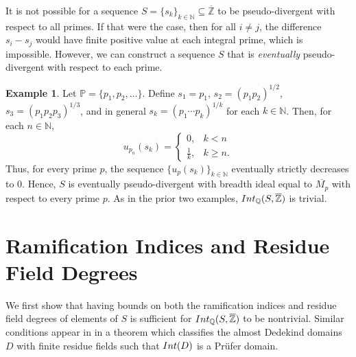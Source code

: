 \documentclass{article}
\theoremstyle{definition}\newtheorem{Def}[equation]{Definition}
\newtheorem{Ex}[equation]{Example}
\theoremstyle{definition}\newtheorem{Ques}[equation]{Question}
\theoremstyle{definition}\newtheorem{Conj}[equation]{Conjecture}
\theoremstyle{definition}\newtheorem{Not}[equation]{Notation}
\newcommand{\N}{\mathbb{N}}
\newcommand{\Q}{\mathbb{Q}}
\newcommand{\oQ}{\overline{\Q}}
\newcommand{\oZ}{\overline{\Z}}
\newcommand{\Z}{\mathbb{Z}}
\newcommand{\oMp}{\overline{M_p}}
\newcommand{\Int}{\textnormal{Int}}
\newcommand{\IntQ}{\Int_{\Q}}
\newcommand{\PP}{\mathbb{P}}
\numberwithin{equation}{section}
\begin{document}
It is not possible for a sequence $S = \{s_k\}_{k \in \N} \subseteq \oZ$ to be pseudo-divergent with respect to all primes. If that were the case, then for all $i \ne j$, the difference $s_i-s_j$ would have finite positive value at each integral prime, which is impossible. However, we can construct a sequence $S$ that is \textit{eventually} pseudo-divergent with respect to each prime.


\begin{Ex}\label{Pseudo-divergent example}
Let $\PP=\{p_1, p_2, \ldots\}$. Define $s_1 = p_1$, $s_2 = (p_1p_2)^{1/2}$, $s_3 = (p_1p_2p_3)^{1/3}$, and in general $s_k = (p_1 \cdots p_k)^{1/k}$ for each $k \in \N$. 
Then, for each $n \in \N$,
\begin{equation*}
u_{p_n}(s_k) = \begin{cases} 0, & k < n\\ \tfrac{1}{k}, & k \geq n.\end{cases}
\end{equation*}
Thus, for every prime $p$, the sequence $\{u_p(s_k)\}_{k \in \N}$ eventually strictly decreases to 0. Hence, $S$ is eventually pseudo-divergent with breadth ideal equal to $\oMp$  with respect to every prime $p$. As in the prior two examples, $\IntQ(S,\oZ)$ is trivial.
\end{Ex}


\section{Ramification Indices and Residue Field Degrees}\label{e and f section}

We first show that having bounds on both the ramification indices and residue field degrees of elements of $S$ is sufficient for $\IntQ(S,\oZ)$ to be nontrivial. Similar conditions appear in \cite{LopIntD} in a theorem which classifies the almost Dedekind domains $D$ with finite residue fields such that $\Int(D)$ is a Pr\"{u}fer domain.
\end{document}
